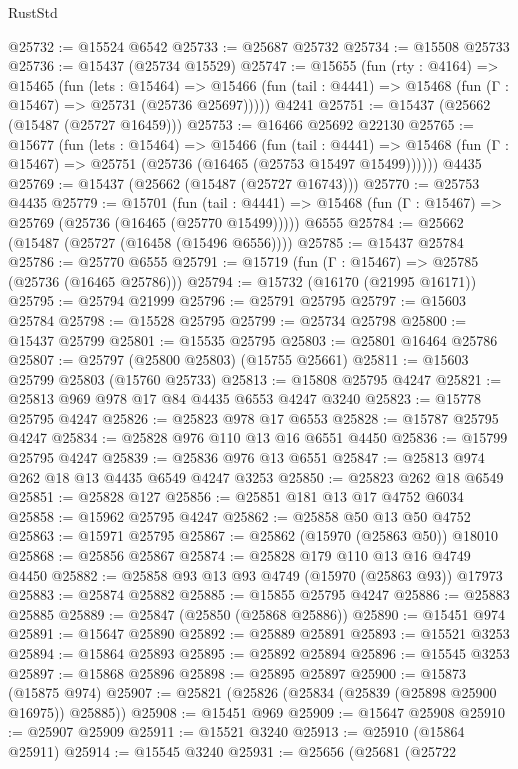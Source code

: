 \begin{lexlean}{RustStd}
\begin{coremodule}
@25732 := @15524 @6542
@25733 := @25687 @25732
@25734 := @15508 @25733
@25736 := @15437 (@25734 @15529)
@25747 := @15655
    (fun (rty : @4164) =>
    @15465
      (fun (lets : @15464) =>
      @15466 (fun (tail : @4441) => @15468 (fun (Γ : @15467) => @25731 (@25736 @25697)))))
    @4241
@25751 := @15437 (@25662 (@15487 (@25727 @16459)))
@25753 := @16466 @25692 @22130
@25765 := @15677
    (fun (lets : @15464) =>
    @15466
      (fun (tail : @4441) =>
      @15468 (fun (Γ : @15467) => @25751 (@25736 (@16465 (@25753 @15497 @15499))))))
    @4435
@25769 := @15437 (@25662 (@15487 (@25727 @16743)))
@25770 := @25753 @4435
@25779 := @15701
    (fun (tail : @4441) => @15468 (fun (Γ : @15467) => @25769 (@25736 (@16465 (@25770 @15499)))))
    @6555
@25784 := @25662 (@15487 (@25727 (@16458 (@15496 @6556))))
@25785 := @15437 @25784
@25786 := @25770 @6555
@25791 := @15719 (fun (Γ : @15467) => @25785 (@25736 (@16465 @25786)))
@25794 := @15732 (@16170 (@21995 @16171))
@25795 := @25794 @21999
@25796 := @25791 @25795
@25797 := @15603 @25784
@25798 := @15528 @25795
@25799 := @25734 @25798
@25800 := @15437 @25799
@25801 := @15535 @25795
@25803 := @25801 @16464 @25786
@25807 := @25797 (@25800 @25803) (@15755 @25661)
@25811 := @15603 @25799 @25803 (@15760 @25733)
@25813 := @15808 @25795 @4247
@25821 := @25813 @969 @978 @17 @84 @4435 @6553 @4247 @3240
@25823 := @15778 @25795 @4247
@25826 := @25823 @978 @17 @6553
@25828 := @15787 @25795 @4247
@25834 := @25828 @976 @110 @13 @16 @6551 @4450
@25836 := @15799 @25795 @4247
@25839 := @25836 @976 @13 @6551
@25847 := @25813 @974 @262 @18 @13 @4435 @6549 @4247 @3253
@25850 := @25823 @262 @18 @6549
@25851 := @25828 @127
@25856 := @25851 @181 @13 @17 @4752 @6034
@25858 := @15962 @25795 @4247
@25862 := @25858 @50 @13 @50 @4752
@25863 := @15971 @25795
@25867 := @25862 (@15970 (@25863 @50)) @18010
@25868 := @25856 @25867
@25874 := @25828 @179 @110 @13 @16 @4749 @4450
@25882 := @25858 @93 @13 @93 @4749 (@15970 (@25863 @93)) @17973
@25883 := @25874 @25882
@25885 := @15855 @25795 @4247
@25886 := @25883 @25885
@25889 := @25847 (@25850 (@25868 @25886))
@25890 := @15451 @974
@25891 := @15647 @25890
@25892 := @25889 @25891
@25893 := @15521 @3253
@25894 := @15864 @25893
@25895 := @25892 @25894
@25896 := @15545 @3253
@25897 := @15868 @25896
@25898 := @25895 @25897
@25900 := @15873 (@15875 @974)
@25907 := @25821 (@25826 (@25834 (@25839 (@25898 @25900 @16975)) @25885))
@25908 := @15451 @969
@25909 := @15647 @25908
@25910 := @25907 @25909
@25911 := @15521 @3240
@25913 := @25910 (@15864 @25911)
@25914 := @15545 @3240
@25931 := @25656
    (@25681
      (@25722

\end{coremodule}
\end{lexlean}

